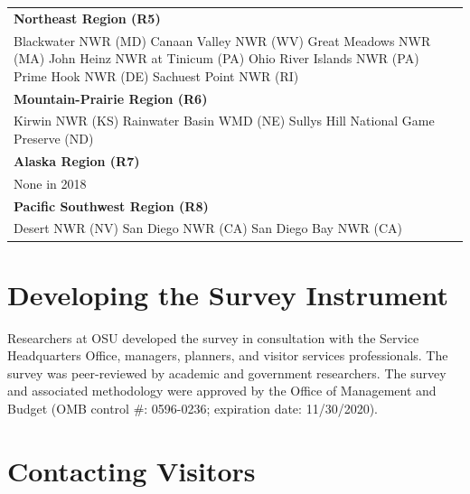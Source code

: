 \documentclass[]{book}
\begin{document}
\begin{longtable}[]{@{}l@{}}
\begin{minipage}[t]{0.05\columnwidth}
\textbf{Northeast Region (R5)}\strut
\end{minipage}\tabularnewline
\begin{minipage}[t]{0.05\columnwidth}\raggedright\strut
Blackwater NWR (MD) Canaan Valley NWR (WV) Great Meadows NWR (MA) John
Heinz NWR at Tinicum (PA) Ohio River Islands NWR (PA) Prime Hook NWR
(DE) Sachuest Point NWR (RI)\strut
\end{minipage}\tabularnewline
\begin{minipage}[t]{0.05\columnwidth}\raggedright\strut
\textbf{Mountain-Prairie Region (R6)}\strut
\end{minipage}\tabularnewline
\begin{minipage}[t]{0.05\columnwidth}\raggedright\strut
Kirwin NWR (KS) Rainwater Basin WMD (NE) Sullys Hill National Game
Preserve (ND)\strut
\end{minipage}\tabularnewline
\begin{minipage}[t]{0.05\columnwidth}\raggedright\strut
\textbf{Alaska Region (R7)}\strut
\end{minipage}\tabularnewline
\begin{minipage}[t]{0.05\columnwidth}\raggedright\strut
None in 2018\strut
\end{minipage}\tabularnewline
\begin{minipage}[t]{0.05\columnwidth}\raggedright\strut
\textbf{Pacific Southwest Region (R8)}\strut
\end{minipage}\tabularnewline
\begin{minipage}[t]{0.05\columnwidth}\raggedright\strut
Desert NWR (NV) San Diego NWR (CA) San Diego Bay NWR (CA)\strut
\end{minipage}\tabularnewline
\bottomrule
\end{longtable}

\section{Developing the Survey
Instrument}\label{developing-the-survey-instrument}

Researchers at OSU developed the survey in consultation with the Service
Headquarters Office, managers, planners, and visitor services
professionals. The survey was peer-reviewed by academic and government
researchers. The survey and associated methodology were approved by the
Office of Management and Budget (OMB control \#: 0596-0236; expiration
date: 11/30/2020).

\section{Contacting Visitors}\label{contacting-visitors-1}
\end{document}
